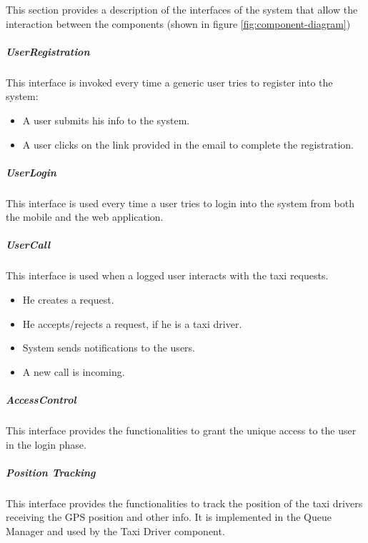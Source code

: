 This section provides a description of the interfaces of the system that allow the interaction between the components (shown in figure \ref{fig:component-diagram})

\subparagraph{UserRegistration}
This interface is invoked every time a generic user tries to register into the system:
\begin{itemize}
    \item A user submits his info to the system.
    \item A user clicks on the link provided in the email to complete the registration.
\end{itemize}

\subparagraph{UserLogin}
This interface is used every time a user tries to login into the system from both the mobile and the web application.

\subparagraph{UserCall}
This interface is used when a logged user interacts with the taxi requests.
\begin{itemize}
    \item He creates a request.
    \item He accepts/rejects a request, if he is a taxi driver.
    \item System sends notifications to the users.
    \item A new call is incoming.
\end{itemize}

\subparagraph{AccessControl}
This interface provides the functionalities to grant the unique access to the user in the login phase.

\subparagraph{Position Tracking}
This interface provides the functionalities to track the position of the taxi drivers receiving the GPS position and other info. It is implemented in the Queue Manager and used by the Taxi Driver component.